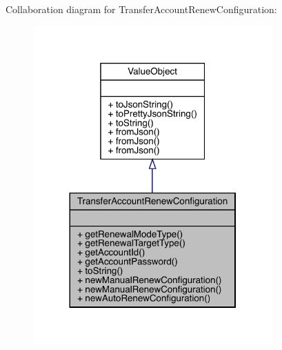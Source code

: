 Collaboration diagram for Transfer\+Account\+Renew\+Configuration\+:
\nopagebreak
\begin{figure}[H]
\begin{center}
\leavevmode
\includegraphics[width=260pt]{classcom_1_1toast_1_1android_1_1gamebase_1_1auth_1_1transfer_1_1data_1_1_transfer_account_renew_configuration__coll__graph}
\end{center}
\end{figure}
